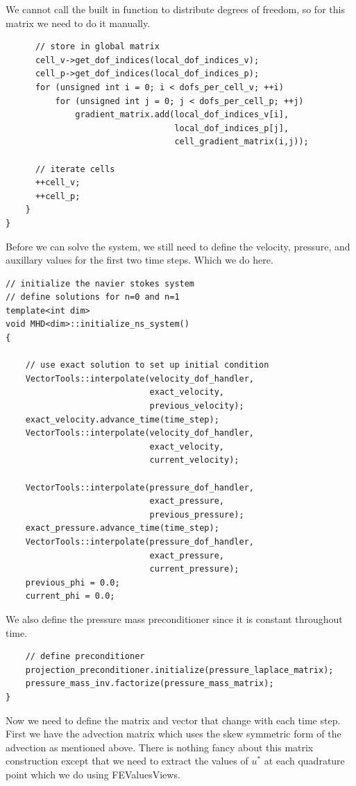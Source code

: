 \documentclass{article}
\begin{document}
We cannot call the built in function to distribute degrees of freedom, so for this matrix we need to do it manually.
\begin{lstlisting}
      // store in global matrix
      cell_v->get_dof_indices(local_dof_indices_v);
      cell_p->get_dof_indices(local_dof_indices_p);
      for (unsigned int i = 0; i < dofs_per_cell_v; ++i)
          for (unsigned int j = 0; j < dofs_per_cell_p; ++j)
              gradient_matrix.add(local_dof_indices_v[i],
                                  local_dof_indices_p[j],
                                  cell_gradient_matrix(i,j));

      // iterate cells
      ++cell_v;
      ++cell_p;
    }
}
\end{lstlisting}
Before we can solve the system, we still need to define the velocity, pressure, and auxillary values for the first two time steps. Which we do here.
\begin{lstlisting}
// initialize the navier stokes system
// define solutions for n=0 and n=1
template<int dim>
void MHD<dim>::initialize_ns_system()
{

    // use exact solution to set up initial condition
    VectorTools::interpolate(velocity_dof_handler,
                             exact_velocity,
                             previous_velocity);
    exact_velocity.advance_time(time_step);
    VectorTools::interpolate(velocity_dof_handler,
                             exact_velocity,
                             current_velocity);

    VectorTools::interpolate(pressure_dof_handler,
                             exact_pressure,
                             previous_pressure);
    exact_pressure.advance_time(time_step);
    VectorTools::interpolate(pressure_dof_handler,
                             exact_pressure,
                             current_pressure);
    previous_phi = 0.0;
    current_phi = 0.0;
\end{lstlisting}
We also define the pressure mass preconditioner since it is constant throughout time.
\begin{lstlisting}
    // define preconditioner
    projection_preconditioner.initialize(pressure_laplace_matrix);
    pressure_mass_inv.factorize(pressure_mass_matrix);
}
\end{lstlisting}
Now we need to define the matrix and vector that change with each time step. First we have the advection matrix which uses the skew symmetric form of the advection as mentioned above. There is nothing fancy about this matrix construction except that we need to extract the values of $u^*$ at each quadrature point which we do using FEValuesViews.
\end{document}
